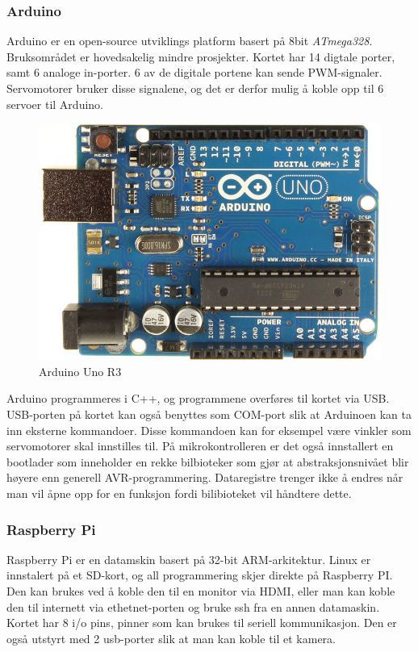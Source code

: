 \subsubsection{Arduino}
Arduino er en open-source utviklings platform basert på 8bit \textit{ATmega328}. Bruksområdet er hovedsakelig mindre prosjekter. Kortet har 14 digtale porter, samt 6 analoge in-porter. 6 av de digitale portene kan sende PWM-signaler. Servomotorer bruker disse signalene, og det er derfor mulig å koble opp til 6 servoer til Arduino. 
\begin{figure}[h!]
\centering
\includegraphics[scale = 0.25]{img/arduinoBoard.jpg}
\caption{Arduino Uno R3}
\end{figure}
Arduino programmeres i C++, og programmene overføres til kortet via USB. USB-porten på kortet kan også benyttes som COM-port slik at Arduinoen kan ta inn eksterne kommandoer. Disse kommandoen kan for eksempel være vinkler som servomotorer skal innstilles til. På mikrokontrolleren er det også innstallert en bootlader som inneholder en rekke bilbioteker som gjør at abstraksjonsnivået blir høyere enn generell AVR-programmering. Dataregistre trenger ikke å endres når man vil åpne opp for en funksjon fordi bilibioteket vil håndtere dette. 

\subsubsection{Raspberry Pi}
Raspberry Pi er en datamskin basert på 32-bit ARM-arkitektur. Linux er innstalert på et SD-kort, og all programmering skjer direkte på Raspberry PI. Den kan brukes ved å koble den til en monitor via HDMI, eller man kan koble den til internett via ethetnet-porten og bruke ssh fra en annen datamaskin. Kortet har 8 i/o pins, pinner som kan brukes til seriell kommunikasjon. Den er også utstyrt med 2 usb-porter slik at man kan koble til et kamera. 

